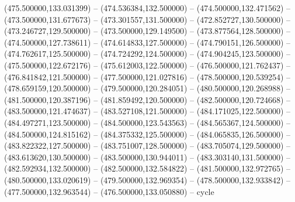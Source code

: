    (475.500000,133.031399) -- (474.536384,132.500000) -- (474.500000,132.471562) -- (473.500000,131.677673) -- (473.301557,131.500000) -- (472.852727,130.500000) -- (473.246727,129.500000) -- (473.500000,129.149500) -- (473.877564,128.500000) -- (474.500000,127.738611) -- (474.614833,127.500000) -- (474.790151,126.500000) -- (474.762617,125.500000) -- (474.724292,124.500000) -- (474.904245,123.500000) -- (475.500000,122.672176) -- (475.612003,122.500000) -- (476.500000,121.762437) -- (476.841842,121.500000) -- (477.500000,121.027816) -- (478.500000,120.539254) -- (478.659159,120.500000) -- (479.500000,120.284051) -- (480.500000,120.268988) -- (481.500000,120.387196) -- (481.859492,120.500000) -- (482.500000,120.724668) -- (483.500000,121.474637) -- (483.527108,121.500000) -- (484.171025,122.500000) -- (484.497271,123.500000) -- (484.500000,123.543563) -- (484.565367,124.500000) -- (484.500000,124.815162) -- (484.375332,125.500000) -- (484.065835,126.500000) -- (483.822322,127.500000) -- (483.751007,128.500000) -- (483.705074,129.500000) -- (483.613620,130.500000) -- (483.500000,130.944011) -- (483.303140,131.500000) -- (482.592934,132.500000) -- (482.500000,132.584822) -- (481.500000,132.972765) -- (480.500000,133.020619) -- (479.500000,132.969354) -- (478.500000,132.933842) -- (477.500000,132.963544) -- (476.500000,133.050880) -- cycle
